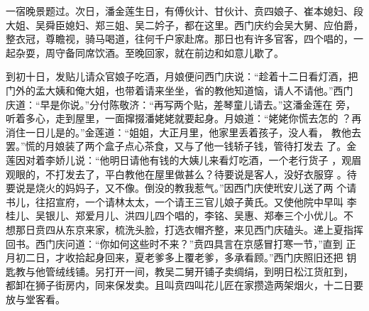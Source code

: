 一宿晚景题过。次日，潘金莲生日，有傅伙计、甘伙计、贲四娘子、崔本媳妇、段
大姐、吴舜臣媳妇、郑三姐、吴二妗子，都在这里。西门庆约会吴大舅、应伯爵，
整衣冠，尊瞻视，骑马喝道，往何千户家赴席。那日也有许多官客，四个唱的，一
起杂耍，周守备同席饮酒。至晚回家，就在前边和如意儿歇了。

到初十日，发贴儿请众官娘子吃酒，月娘便问西门庆说：“趁着十二日看灯酒，把
门外的孟大姨和俺大姐，也带着请来坐坐，省的教他知道恼，请人不请他。”西门
庆道：“早是你说。”分付陈敬济：“再写两个贴，差琴童儿请去。”这潘金莲在
旁，听着多心，走到屋里，一面撺掇潘姥姥就要起身。月娘道：“姥姥你慌去怎的
？再消住一日儿是的。”金莲道：“姐姐，大正月里，他家里丢着孩子，没人看，
教他去罢。”慌的月娘装了两个盒子点心茶食，又与了他一钱轿子钱，管待打发去
了。金莲因对着李娇儿说：“他明日请他有钱的大姨儿来看灯吃酒，一个老行货子
，观眉观眼的，不打发去了，平白教他在屋里做甚么？待要说是客人，没好衣服穿
。待要说是烧火的妈妈子，又不像。倒没的教我惹气。”因西门庆使玳安儿送了两
个请书儿，往招宣府，一个请林太太，一个请王三官儿娘子黄氏。又使他院中早叫
李桂儿、吴银儿、郑爱月儿、洪四儿四个唱的，李铭、吴惠、郑奉三个小优儿。不
想那日贲四从东京来家，梳洗头脸，打选衣帽齐整，来见西门庆磕头。递上夏指挥
回书。西门庆问道：“你如何这些时不来？”贲四具言在京感冒打寒一节，”直到
正月初二日，才收拾起身回来，夏老爹多上覆老爹，多承看顾。”西门庆照旧还把
钥匙教与他管绒线铺。另打开一间，教吴二舅开铺子卖绸绢，到明日松江货舡到，
都卸在狮子街房内，同来保发卖。且叫贲四叫花儿匠在家攒造两架烟火，十二日要
放与堂客看。

